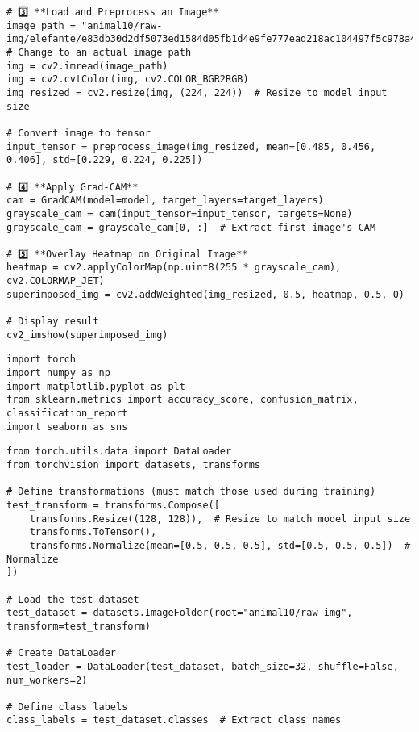 \begin{verbatim}
# 3️⃣ **Load and Preprocess an Image**
image_path = "animal10/raw-img/elefante/e83db30d2df5073ed1584d05fb1d4e9fe777ead218ac104497f5c978a4efbcb0_640.jpg"  # Change to an actual image path
img = cv2.imread(image_path)
img = cv2.cvtColor(img, cv2.COLOR_BGR2RGB)
img_resized = cv2.resize(img, (224, 224))  # Resize to model input size

# Convert image to tensor
input_tensor = preprocess_image(img_resized, mean=[0.485, 0.456, 0.406], std=[0.229, 0.224, 0.225])

# 4️⃣ **Apply Grad-CAM**
cam = GradCAM(model=model, target_layers=target_layers)
grayscale_cam = cam(input_tensor=input_tensor, targets=None)
grayscale_cam = grayscale_cam[0, :]  # Extract first image's CAM

# 5️⃣ **Overlay Heatmap on Original Image**
heatmap = cv2.applyColorMap(np.uint8(255 * grayscale_cam), cv2.COLORMAP_JET)
superimposed_img = cv2.addWeighted(img_resized, 0.5, heatmap, 0.5, 0)

# Display result
cv2_imshow(superimposed_img)
\end{verbatim}

\begin{verbatim}
import torch
import numpy as np
import matplotlib.pyplot as plt
from sklearn.metrics import accuracy_score, confusion_matrix, classification_report
import seaborn as sns

\end{verbatim}

\begin{verbatim}
from torch.utils.data import DataLoader
from torchvision import datasets, transforms

# Define transformations (must match those used during training)
test_transform = transforms.Compose([
    transforms.Resize((128, 128)),  # Resize to match model input size
    transforms.ToTensor(),
    transforms.Normalize(mean=[0.5, 0.5, 0.5], std=[0.5, 0.5, 0.5])  # Normalize
])

# Load the test dataset
test_dataset = datasets.ImageFolder(root="animal10/raw-img", transform=test_transform)

# Create DataLoader
test_loader = DataLoader(test_dataset, batch_size=32, shuffle=False, num_workers=2)

# Define class labels
class_labels = test_dataset.classes  # Extract class names

\end{verbatim}


